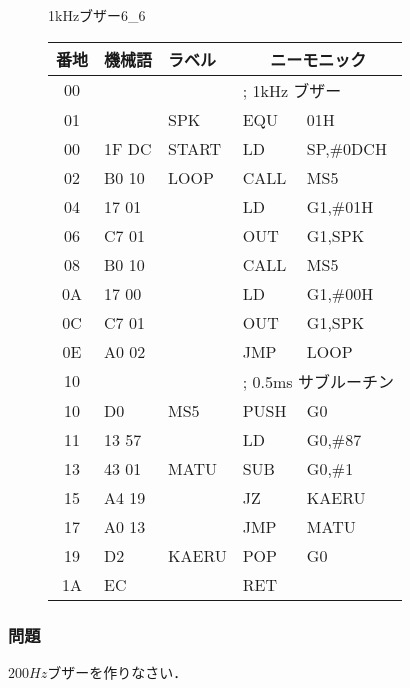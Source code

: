 \begin{figure}[btp]
\begin{reidai}{1kHzブザー}{6_6}
{{\footnotesize\tt\begin{center}
\begin{tabular}{|c|l|l| l l|} \hline
番地 & 機械語 & ラベル & \multicolumn{2}{c|}{ニーモニック} \\
\hline
00 &          &        &\multicolumn{2}{|l|}{; 1kHz ブザー} \\
01 &          & SPK    & EQU &    01H              \\
00 & 1F DC    & START  & LD  &    SP,\#0DCH        \\
02 & B0 10    & LOOP   & CALL&    MS5              \\
04 & 17 01    &        & LD  &    G1,\#01H         \\
06 & C7 01    &        & OUT &    G1,SPK           \\
08 & B0 10    &        & CALL&    MS5              \\
0A & 17 00    &        & LD  &    G1,\#00H         \\
0C & C7 01    &        & OUT &    G1,SPK           \\
0E & A0 02    &        & JMP &    LOOP             \\
10 &          &        &\multicolumn{2}{|l|}{; 0.5ms サブルーチン} \\
10 & D0       & MS5    & PUSH&    G0               \\
11 & 13 57    &        & LD  &    G0,\#87          \\
13 & 43 01    & MATU   & SUB &    G0,\#1           \\
15 & A4 19    &        & JZ  &    KAERU            \\
17 & A0 13    &        & JMP &    MATU             \\
19 & D2       & KAERU  & POP &    G0               \\
1A & EC       &        & RET &                     \\
\hline
\end{tabular}
\end{center}}
}\end{reidai}
\end{figure}

\vfill
\subsubsection{問題}
$200Hz$ブザーを作りなさい．
\vfill

